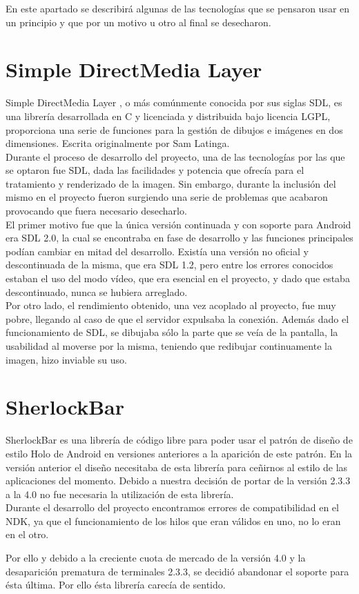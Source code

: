 En este apartado se describirá algunas de las tecnologías que se pensaron usar en un principio y que por un motivo u otro al final se desecharon.

\section{Simple DirectMedia Layer}

Simple DirectMedia Layer \cite{sdl:sdl}\cite{sdl2:sdl2}, o más comúnmente conocida por sus siglas SDL, es una librería desarrollada en C y licenciada y distribuida bajo licencia LGPL, proporciona una serie de funciones para la gestión de dibujos e imágenes en dos dimensiones. Escrita originalmente por Sam Latinga.\\

Durante el proceso de desarrollo del proyecto, una de las tecnologías por las que se optaron fue SDL, dada las facilidades y potencia que ofrecía para el tratamiento y renderizado de la imagen. Sin embargo, durante la inclusión del mismo en el proyecto fueron surgiendo una serie de problemas que acabaron provocando que fuera necesario desecharlo.\\

El primer motivo fue que la única versión continuada y con soporte para Android era SDL 2.0, la cual se encontraba en fase de desarrollo y las funciones principales podían cambiar en mitad del desarrollo. Existía una versión no oficial y descontinuada de la misma, que era SDL 1.2, pero entre los errores conocidos estaban el uso del modo vídeo, que era esencial en el proyecto, y dado que estaba descontinuado, nunca se hubiera arreglado.\\

Por otro lado, el rendimiento obtenido, una vez acoplado al proyecto, fue muy pobre, llegando al caso de que el servidor expulsaba la conexión. Además dado el funcionamiento de SDL, se dibujaba sólo la parte que se veía de la pantalla, la usabilidad al moverse por la misma, teniendo que redibujar continuamente la imagen, hizo inviable su uso.
\newpage
\section{SherlockBar}

SherlockBar\cite{sherlock:sherlock} es una librería de código libre para poder usar el patrón de diseño de estilo Holo de Android en versiones anteriores a la aparición de este patrón. En la versión anterior el diseño necesitaba de esta librería para ceñirnos al estilo de las aplicaciones del momento. Debido a nuestra decisión de portar de la versión 2.3.3 a la 4.0 no fue necesaria la utilización de esta librería.\\

Durante el desarrollo del proyecto encontramos errores de compatibilidad en el NDK, ya que el funcionamiento de los hilos que eran válidos en uno, no lo eran en el otro.

Por ello y debido a la creciente cuota de mercado de la versión 4.0 y la desaparición prematura de terminales 2.3.3, se decidió abandonar el soporte para ésta última. Por ello ésta librería carecía de sentido. 
